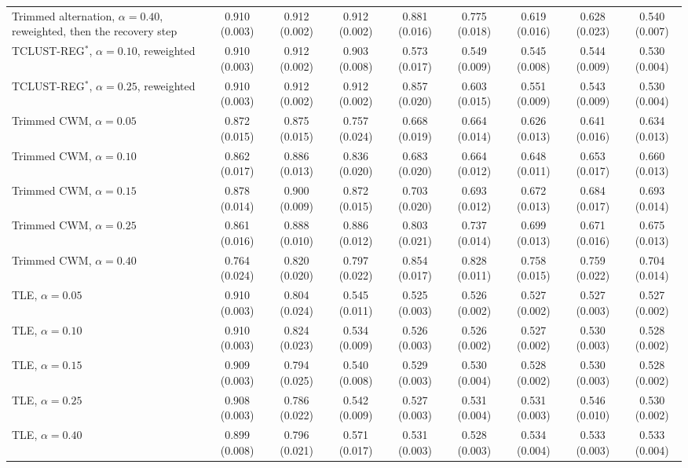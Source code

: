 \begin{table}[htbp]
{\begin{tabular}{lcccccccc}
Trimmed alternation, $\alpha=0.40$, reweighted, then the recovery step & 0.910 (0.003) & 0.912 (0.002) & 0.912 (0.002) & 0.881 (0.016) & 0.775 (0.018) & 0.619 (0.016) & 0.628 (0.023) & 0.540 (0.007) \\
TCLUST-REG$^{\ast}$, $\alpha=0.10$, reweighted & 0.910 (0.003) & 0.912 (0.002) & 0.903 (0.008) & 0.573 (0.017) & 0.549 (0.009) & 0.545 (0.008) & 0.544 (0.009) & 0.530 (0.004) \\
TCLUST-REG$^{\ast}$, $\alpha=0.25$, reweighted & 0.910 (0.003) & 0.912 (0.002) & 0.912 (0.002) & 0.857 (0.020) & 0.603 (0.015) & 0.551 (0.009) & 0.543 (0.009) & 0.530 (0.004) \\
Trimmed CWM, $\alpha=0.05$ & 0.872 (0.015) & 0.875 (0.015) & 0.757 (0.024) & 0.668 (0.019) & 0.664 (0.014) & 0.626 (0.013) & 0.641 (0.016) & 0.634 (0.013) \\
Trimmed CWM, $\alpha=0.10$ & 0.862 (0.017) & 0.886 (0.013) & 0.836 (0.020) & 0.683 (0.020) & 0.664 (0.012) & 0.648 (0.011) & 0.653 (0.017) & 0.660 (0.013) \\
Trimmed CWM, $\alpha=0.15$ & 0.878 (0.014) & 0.900 (0.009) & 0.872 (0.015) & 0.703 (0.020) & 0.693 (0.012) & 0.672 (0.013) & 0.684 (0.017) & 0.693 (0.014) \\
Trimmed CWM, $\alpha=0.25$ & 0.861 (0.016) & 0.888 (0.010) & 0.886 (0.012) & 0.803 (0.021) & 0.737 (0.014) & 0.699 (0.013) & 0.671 (0.016) & 0.675 (0.013) \\
Trimmed CWM, $\alpha=0.40$ & 0.764 (0.024) & 0.820 (0.020) & 0.797 (0.022) & 0.854 (0.017) & 0.828 (0.011) & 0.758 (0.015) & 0.759 (0.022) & 0.704 (0.014) \\
TLE, $\alpha=0.05$ & 0.910 (0.003) & 0.804 (0.024) & 0.545 (0.011) & 0.525 (0.003) & 0.526 (0.002) & 0.527 (0.002) & 0.527 (0.003) & 0.527 (0.002) \\
TLE, $\alpha=0.10$ & 0.910 (0.003) & 0.824 (0.023) & 0.534 (0.009) & 0.526 (0.003) & 0.526 (0.002) & 0.527 (0.002) & 0.530 (0.003) & 0.528 (0.002) \\
TLE, $\alpha=0.15$ & 0.909 (0.003) & 0.794 (0.025) & 0.540 (0.008) & 0.529 (0.003) & 0.530 (0.004) & 0.528 (0.002) & 0.530 (0.003) & 0.528 (0.002) \\
TLE, $\alpha=0.25$ & 0.908 (0.003) & 0.786 (0.022) & 0.542 (0.009) & 0.527 (0.003) & 0.531 (0.004) & 0.531 (0.003) & 0.546 (0.010) & 0.530 (0.002) \\
TLE, $\alpha=0.40$ & 0.899 (0.008) & 0.796 (0.021) & 0.571 (0.017) & 0.531 (0.003) & 0.528 (0.003) & 0.534 (0.004) & 0.533 (0.003) & 0.533 (0.004) \\

\end{tabular}}
\end{table}
